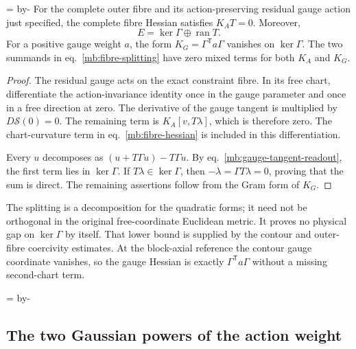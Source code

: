 \documentclass[11pt,letterpaper,reqno]{amsart}
\makeatletter
\numberwithin{equation}{section}
\renewcommand{\eqref}[1]{\textup{eq.~\ref{#1}}}
\newcommand{\mbneedspace}[1]{\par\begingroup
  \dimen0=\pagegoal\advance\dimen0 by-\pagetotal
  \ifdim\dimen0<#1\relax\newpage\fi\endgroup}
\theoremstyle{definition}
\newcommand{\ms@minorstart}{%
  \pushQED{\qed}\renewcommand{\qedsymbol}{$\blacksquare$}}
\newenvironment{lemma}[1][]{\ms@minorstart\ms@lemma[#1]}
  {\popQED\endms@lemma}
\theoremstyle{remark}
\makeatother
\begin{document}
\mbneedspace{14\baselineskip}
\begin{lemma}[Gauge null splitting]\label{mb:fibre-gauge-null}
For the complete outer fibre and its action-preserving residual gauge action just specified, the complete fibre Hessian satisfies $K_AT=0$. Moreover,
\begin{equation}\label{mb:fibre-splitting}
 E=\ker\Gamma\oplus\operatorname{ran}T.
\end{equation}
For a positive gauge weight $a$, the form
$K_G=\Gamma^{\mathsf T}a\Gamma$ vanishes on $\ker\Gamma$.
The two summands in \eqref{mb:fibre-splitting} have zero mixed
terms for both $K_A$ and $K_G$.
\end{lemma}
\begin{proof}
The residual gauge acts on the exact constraint fibre. In its
free chart, differentiate the action-invariance identity once
in the gauge parameter and once in a free direction at zero.
The derivative of the gauge tangent is multiplied by
$D\mathcal S(0)=0$. The remaining term is $K_A[v,T\lambda]$,
which is therefore zero. The chart-curvature term in
\eqref{mb:fibre-hessian} is included in this differentiation.

Every $u$ decomposes as $(u+T\Gamma u)-T\Gamma u$.
By \eqref{mb:gauge-tangent-readout}, the first term lies in
$\ker\Gamma$. If $T\lambda\in\ker\Gamma$, then
$-\lambda=\Gamma T\lambda=0$, proving that the sum is direct.
The remaining assertions follow from the Gram form of $K_G$.
\end{proof}

The splitting is a decomposition for the quadratic forms; it
need not be orthogonal in the original free-coordinate Euclidean
metric. It proves no physical gap on $\ker\Gamma$ by itself.
That lower bound is supplied by the contour and outer-fibre
coercivity estimates. At the block-axial reference the contour
gauge coordinate vanishes, so the gauge Hessian is exactly
$\Gamma^{\mathsf T}a\Gamma$ without a missing second-chart term.


\mbneedspace{16\baselineskip}
\subsection{The two Gaussian powers of the action weight}
\end{document}
